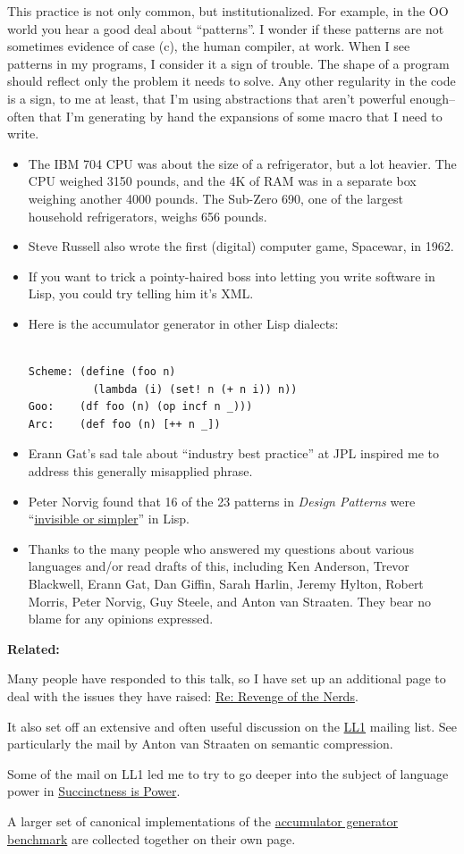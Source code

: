 This practice is not only common, but institutionalized. For example, in
the OO world you hear a good deal about ``patterns''. I wonder if these
patterns are not sometimes evidence of case (c), the human compiler, at
work. When I see patterns in my programs, I consider it a sign of
trouble. The shape of a program should reflect only the problem it needs
to solve. Any other regularity in the code is a sign, to me at least,
that I'm using abstractions that aren't powerful enough-- often that I'm
generating by hand the expansions of some macro that I need to write.


\begin{itemize}
\item
  The IBM 704 CPU was about the size of a refrigerator, but a lot
  heavier. The CPU weighed 3150 pounds, and the 4K of RAM was in a
  separate box weighing another 4000 pounds. The Sub-Zero 690, one of
  the largest household refrigerators, weighs 656 pounds.
\item
  Steve Russell also wrote the first (digital) computer game, Spacewar,
  in 1962.
\item
  If you want to trick a pointy-haired boss into letting you write
  software in Lisp, you could try telling him it's XML.
\item
  Here is the accumulator generator in other Lisp dialects:

\begin{verbatim}

Scheme: (define (foo n)
          (lambda (i) (set! n (+ n i)) n))
Goo:    (df foo (n) (op incf n _)))
Arc:    (def foo (n) [++ n _])
\end{verbatim}
\item
  Erann Gat's sad tale about ``industry best practice'' at JPL inspired
  me to address this generally misapplied phrase.
\item
  Peter Norvig found that 16 of the 23 patterns in \emph{Design
  Patterns} were
  ``\href{http://www.norvig.com/design-patterns/}{invisible or
  simpler}'' in Lisp.
\item
  Thanks to the many people who answered my questions about various
  languages and/or read drafts of this, including Ken Anderson, Trevor
  Blackwell, Erann Gat, Dan Giffin, Sarah Harlin, Jeremy Hylton, Robert
  Morris, Peter Norvig, Guy Steele, and Anton van Straaten. They bear no
  blame for any opinions expressed.
\end{itemize}

\textbf{Related:}

Many people have responded to this talk, so I have set up an additional
page to deal with the issues they have raised: \href{icadmore.html}{Re:
Revenge of the Nerds}.

It also set off an extensive and often useful discussion on the
\href{http://www.ai.mit.edu/~gregs/ll1-discuss-archive-html/threads.html}{LL1}
mailing list. See particularly the mail by Anton van Straaten on
semantic compression.

Some of the mail on LL1 led me to try to go deeper into the subject of
language power in \href{power.html}{Succinctness is Power}.

A larger set of canonical implementations of the
\href{accgen.html}{accumulator generator benchmark} are collected
together on their own page.